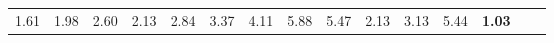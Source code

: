\begin{tabular}{ll|rrrrrrrrr|rrrr}
  


  
  1.61 & 1.98 & 2.60 & 2.13 & 2.84 & 3.37 & 4.11 & 5.88 & 5.47 & 2.13 & 3.13 & 5.44 & \textbf{1.03} \\


\end{tabular}

